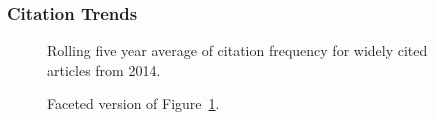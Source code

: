 \documentclass[
  10pt,
  letterpaper,
  DIV=11,
  numbers=noendperiod,
  twoside]{scrartcl}
\begin{document}
\subsubsection*{Citation Trends}\label{sec-trends-2014}

\begin{figure}


\caption{\label{fig-citation-spaghetti-2014}Rolling five year average of
citation frequency for widely cited articles from 2014.}

\end{figure}%

\begin{figure}


\caption{\label{fig-citation-facet-2014}Faceted version of
Figure~\ref{fig-citation-spaghetti-2014}.}

\end{figure}%
\end{document}
